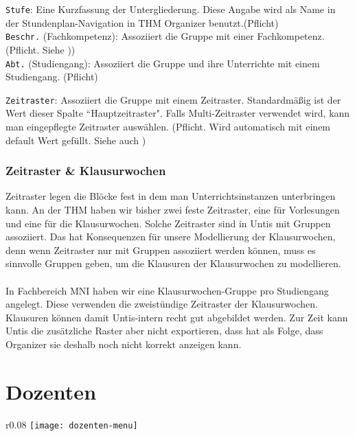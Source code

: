 \noindent
\texttt{Stufe}: Eine Kurzfassung der Untergliederung. Diese Angabe wird als Name in der Stundenplan-Navigation in THM Organizer benutzt.(Pflicht)\\

\noindent
\texttt{Beschr.} (Fachkompetenz): Assoziiert die Gruppe mit einer Fachkompetenz. (Pflicht. Siehe ))\\

\noindent
\texttt{Abt.} (Studiengang): Assoziiert die Gruppe und ihre Unterrichte mit einem Studiengang. (Pflicht)\\

\newpage

\noindent
\texttt{Zeitraster}: Assoziiert die Gruppe mit einem Zeitraster. Standardmäßig ist der Wert dieser Spalte ``Hauptzeitraster". Falls Multi-Zeitraster verwendet wird, kann man eingepflegte Zeitraster auswählen. (Pflicht. Wird automatisch mit einem default Wert gefüllt. Siehe auch )

\subsubsection{Zeitraster \& Klausurwochen}
\label{sec:zeitraster}

Zeitraster legen die Blöcke fest in dem man Unterrichtsinstanzen unterbringen kann. An der THM haben wir bisher zwei feste Zeitraster, eine für Vorlesungen und eine für die Klausurwochen. Solche Zeitraster sind in Untis mit Gruppen assoziiert. Das hat Konsequenzen für unsere Modellierung der Klausurwochen, denn wenn Zeitraster nur mit Gruppen assoziiert werden können, muss es sinnvolle Gruppen geben, um die Klausuren der Klausurwochen zu modellieren.\\
\\
In Fachbereich MNI haben wir eine Klausurwochen-Gruppe pro Studiengang angelegt. Diese verwenden die zweistündige Zeitraster der Klausurwochen. Klausuren können damit Untis-intern recht gut abgebildet werden. Zur Zeit kann Untis die zusätzliche Raster aber nicht exportieren, dass hat als Folge, dass Organizer sie deshalb noch nicht korrekt anzeigen kann.\\

\section{Dozenten}

\begin{wrapfigure}{r}{0.08\textwidth}
	\vspace{-70pt}
	\texttt{[image: dozenten-menu]}
\end{wrapfigure}

